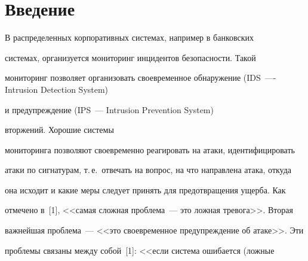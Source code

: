 \vspace*{2pt}

     




\vspace*{2pt}








      \thispagestyle{headings}



      

            \label{st\stat}

            

            \vspace*{-12pt}

     

     

\section{Введение}



                      

    В распределенных корпоративных системах, например в банковских 

системах, организуется мониторинг инцидентов безопасности. Такой 

мониторинг позволяет организовать своевременное обнаружение (IDS~---- Intrusion Detection System)

и предупреждение (IPS~--- Intrusion Prevention System)

вторжений. Хорошие системы 

мониторинга позволяют своевременно реагировать на атаки, идентифицировать 

атаки по сигнатурам, т.\,е.\ отвечать на вопрос, на что направлена атака, откуда 

она исходит и какие меры следует принять для предотвращения ущерба. Как 

отмечено в~[1], <<самая сложная проблема~--- это ложная тревога>>. Вторая 

важнейшая проблема~--- <<это своевременное предупреждение об атаке>>. Эти 

проблемы связаны между собой~[1]: <<если система ошибается (ложные 

